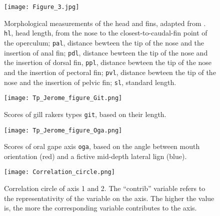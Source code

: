 \begin{figure} [!htbp]
	\begin{center}
		\texttt{[image: Figure\_3.jpg]}
		\caption[Fins morphological measurements]{Morphological measurements of the head and fins, adapted from \citet{keat-chuanng2017,habib2019}. \texttt{hl}, head length, from the nose to the closest-to-caudal-fin point of the operculum; \texttt{pal}, distance bewteen the tip of the nose and the insertion of anal fin; \texttt{pdl}, distance bewteen the tip of the nose and the insertion of dorsal fin, \texttt{ppl}, distance bewteen the tip of the nose and the insertion of pectoral fin; \texttt{pvl}, distance bewteen the tip of the nose and the insertion of pelvic fin;  \texttt{sl}, standard length.}
		\label{fig:fin}
	\end{center}
	
\end{figure}


\begin{figure} [!htbp]
	\begin{center}
	\begin{minipage}{0.45\textwidth}
		\centering
		\texttt{[image: Tp\_Jerome\_figure\_Git.png]}
		\caption[Gill raker types categorical scores]{Scores of gill rakers types \texttt{git}, based on their length.}
		\label{fig:git}
	\end{minipage}\hfill
	\begin{minipage}{0.45\textwidth}
		\centering
		\texttt{[image: Tp\_Jerome\_figure\_Oga.png]}
		\caption[Oral gape axis categorical scores]{Scores of oral gape axis \texttt{oga}, based on the angle between mouth orientation (red) and a fictive mid-depth lateral lign (blue).}
		\label{fig:oga}
	\end{minipage}
	\end{center}
	
\end{figure}

\begin{figure} [!htbp]
	\begin{center}
		\texttt{[image: Correlation\_circle.png]}
	\end{center}
	\caption[FAMD's correlation circle for first and second axis]{Correlation circle of axis 1 and 2. The ``contrib'' variable refers to the representativity of the variable on the axis. The higher the value is, the more the corresponding variable contributes to the axis.}
	\label{fig:corr_circ_12}
\end{figure}


